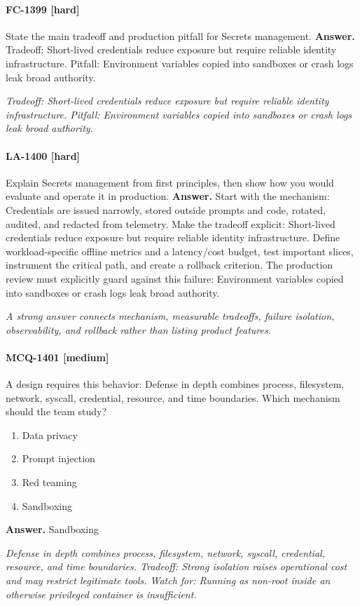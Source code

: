 \paragraph{FC-1399 [hard]} State the main tradeoff and production pitfall for Secrets management.
\noindent\textbf{Answer.} Tradeoff: Short-lived credentials reduce exposure but require reliable identity infrastructure. Pitfall: Environment variables copied into sandboxes or crash logs leak broad authority.
\par\textit{Tradeoff: Short-lived credentials reduce exposure but require reliable identity infrastructure. Pitfall: Environment variables copied into sandboxes or crash logs leak broad authority.}
\paragraph{LA-1400 [hard]} Explain Secrets management from first principles, then show how you would evaluate and operate it in production.
\noindent\textbf{Answer.} Start with the mechanism: Credentials are issued narrowly, stored outside prompts and code, rotated, audited, and redacted from telemetry. Make the tradeoff explicit: Short-lived credentials reduce exposure but require reliable identity infrastructure. Define workload-specific offline metrics and a latency/cost budget, test important slices, instrument the critical path, and create a rollback criterion. The production review must explicitly guard against this failure: Environment variables copied into sandboxes or crash logs leak broad authority.
\par\textit{A strong answer connects mechanism, measurable tradeoffs, failure isolation, observability, and rollback rather than listing product features.}
\paragraph{MCQ-1401 [medium]} A design requires this behavior: Defense in depth combines process, filesystem, network, syscall, credential, resource, and time boundaries. Which mechanism should the team study?
\begin{enumerate}[label=\Alph*.]
\item Data privacy
\item Prompt injection
\item Red teaming
\item Sandboxing
\end{enumerate}
\noindent\textbf{Answer.} Sandboxing
\par\textit{Defense in depth combines process, filesystem, network, syscall, credential, resource, and time boundaries. Tradeoff: Strong isolation raises operational cost and may restrict legitimate tools. Watch for: Running as non-root inside an otherwise privileged container is insufficient.}
